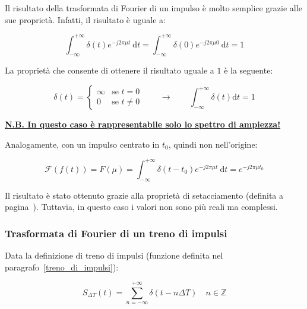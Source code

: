 \documentclass[a4paper]{article}
\begin{document}
	\noindent
	Il risultato della trasformata di Fourier di un impulso è molto semplice grazie alle sue proprietà. Infatti, il risultato è uguale a:
	
	\begin{equation*}
		\int_{-\infty}^{+\infty} \delta\left(t\right) e^{-j 2 \pi \mu t} \: \mathrm{d}t = \int_{-\infty}^{+\infty} \delta\left(0\right) e^{-j 2 \pi \mu 0} \: \mathrm{d}t = 1
	\end{equation*}

	\noindent
	La proprietà che consente di ottenere il risultato uguale a $1$ è la seguente:
	
	\begin{equation*}
		\delta\left(t\right) =
		\begin{cases}
			\infty  & \text{se } t = 0 \\
			0		& \text{se } t \ne 0
		\end{cases}
		\hspace{2em} \longrightarrow \hspace{2em}
		\int_{-\infty}^{+\infty}\delta\left(t\right)\mathrm{d}t = 1
	\end{equation*}

	\noindent
	\textbf{\underline{N.B. In questo caso è rappresentabile solo lo spettro di ampiezza!}}\newline
	
	\noindent
	Analogamente, con un impulso centrato in $t_{0}$, quindi non nell'origine:
	
	\begin{equation*}
		\mathcal{F}\left(f\left(t\right)\right) = F\left(\mu\right) = \int_{-\infty}^{+\infty} \delta\left(t-t_{0}\right) e^{-j 2 \pi \mu t} \: \mathrm{d}t = e^{-j 2 \pi \mu t_{0}}
	\end{equation*}

	\noindent
	Il risultato è stato ottenuto grazie alla proprietà di setacciamento (definita a pagina~\pageref{setacciamento}). Tuttavia, in questo caso i valori non sono più reali ma complessi.
	
	\newpage
	
	\subsubsection{Trasformata di Fourier di un treno di impulsi}
	
	Data la definizione di treno di impulsi (funzione definita nel paragrafo~\ref{treno_di_impulsi}):
	
	\begin{equation*}
		S_{\Delta T}\left(t\right) = \sum_{n = -\infty}^{+\infty} \delta\left(t - n\Delta T\right) \hspace{1em} n \in \mathbb{Z}
	\end{equation*}
\end{document}
